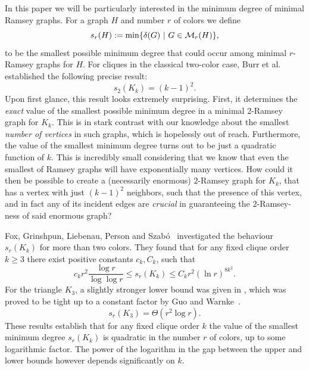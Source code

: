 \documentclass[12pt]{article}
\newcommand{\cM}{{\cal M}}
\theoremstyle{definition}
\begin{document}
	In this paper we will be particularly interested in the minimum degree of minimal Ramsey graphs. For a graph $H$ and number $r$ of colors we define %
	\[s_r(H) := \min\{\delta(G) \,\, | \,\, G \in \cM_r(H)\},\]
	to be the smallest possible minimum degree that could occur among minimal $r$-Ramsey graphs for $H$.  For cliques in the classical two-color case, Burr et al.\ ~\cite{burr1976graphs} established the following precise result: 
	\begin{equation}
		s_2(K_{k})=(k-1)^2.
	\end{equation}
	Upon first glance, this result looks extremely surprising. 
	First, it determines the {\em exact} value of the smallest possible minimum degree in a minimal 2-Ramsey graph for $K_{k}$. This is in stark contrast with our knowledge about the smallest {\em number of vertices} in such graphs, which is hopelessly out of reach. Furthermore, the value of the smallest minimum degree turns out to be just a quadratic function of $k$. This is incredibly small considering that we know that even the smallest of Ramsey graphs will have exponentially many vertices. How could it then be possible to create a (necessarily enormous) $2$-Ramsey graph for $K_{k}$, that has a vertex with just $(k-1)^2$ neighbors, such that the presence of this vertex, and in fact any of its incident edges are {\em crucial} in guaranteeing the $2$-Ramsey-ness of said enormous graph?
	
	Fox, Grinshpun, Liebenau, Person and Szab\'o~\cite{fox2016minimum} investigated the behaviour $s_r(K_{k})$ for more than two colors. They found that for any fixed clique order $k\geq 3$ there exist positive constants $c_k,C_k$, such that 
	\begin{equation} \label{eq:fox-constantk}
		c_kr^2\frac{\log r}{\log\log r} \leq s_r(K_{k}) \leq C_kr^2(\ln r)^{8k^2}.
	\end{equation}
	For the triangle $K_3$, a slightly stronger lower bound was given in \cite{fox2016minimum}, which was proved to be tight up to a constant factor by Guo and Warnke~\cite{guo2020packing}. 
	\begin{equation}
		s_r(K_{3}) = \Theta (r^2 \log r).
	\end{equation}
	These results establish that for any fixed clique order $k$ the value of the smallest minimum degree $s_r(K_k)$ is quadratic in the number $r$ of colors, up to some logarithmic factor. The power of the logarithm in the gap between the upper and lower bounds however depends significantly on $k$. 
	
\end{document}
